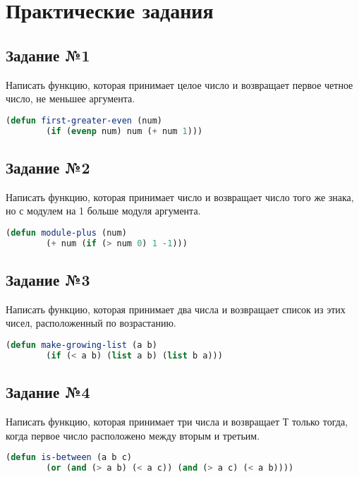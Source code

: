 \chapter{Практические задания}

\section{Задание №1}

Написать функцию, которая принимает целое число и возвращает первое
четное число, не меньшее аргумента.

\begin{lstlisting}[language=Lisp]
	(defun first-greater-even (num)
		(if (evenp num) num (+ num 1)))
\end{lstlisting}

\section{Задание №2}

Написать функцию, которая принимает число и возвращает число
того же знака, но с модулем на 1 больше модуля аргумента.

\begin{lstlisting}[language=Lisp]
	(defun module-plus (num)
		(+ num (if (> num 0) 1 -1)))
\end{lstlisting}

\section{Задание №3}

Написать функцию, которая принимает два числа и возвращает
список из этих чисел, расположенный по возрастанию.

\begin{lstlisting}[language=Lisp]
	(defun make-growing-list (a b)
		(if (< a b) (list a b) (list b a)))
\end{lstlisting}

\section{Задание №4}

Написать функцию, которая принимает три числа и возвращает Т только
тогда, когда первое число расположено между вторым и третьим.

\begin{lstlisting}[language=Lisp]
	(defun is-between (a b c)
		(or (and (> a b) (< a c)) (and (> a c) (< a b))))
\end{lstlisting}

